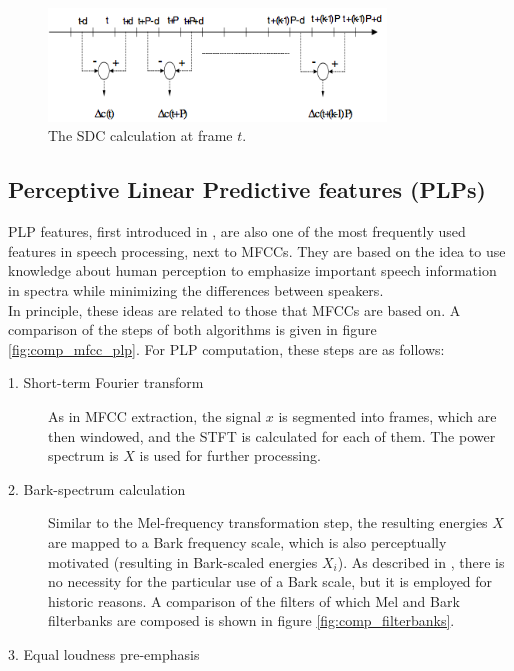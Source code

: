 \begin{figure}
	\begin{center}
		\includegraphics[width=0.8\textwidth]{images/sdc_example.png}
		\caption{The SDC calculation at frame $t$. \cite{torres}}
		\label{fig:sdc_example}
	\end{center}
\end{figure}

\subsection{Perceptive Linear Predictive features (PLPs)} 
PLP features, first introduced in \cite{hermansky90}, are also one of the most frequently used features in speech processing, next to MFCCs. They are based on the idea to use knowledge about human perception to emphasize important speech information in spectra while minimizing the differences between speakers.\\

In principle, these ideas are related to those that MFCCs are based on. A comparison of the steps of both algorithms is given in figure \ref{fig:comp_mfcc_plp}. For PLP computation, these steps are as follows:
\begin{description}
\item[1. Short-term Fourier transform] As in MFCC extraction, the signal $x$ is segmented into frames, which are then windowed, and the STFT is calculated for each of them. The power spectrum is $X$ is used for further processing.
\item[2. Bark-spectrum calculation] Similar to the Mel-frequency transformation step, the resulting energies $X$ are mapped to a Bark frequency scale, which is also perceptually motivated (resulting in Bark-scaled energies $X_i$). As described in \cite{hoenig}, there is no necessity for the particular use of a Bark scale, but it is employed for historic reasons. A comparison of the filters of which Mel  and Bark filterbanks are composed is shown in figure \ref{fig:comp_filterbanks}.
\item[3. Equal loudness pre-emphasis]
\end{description}



